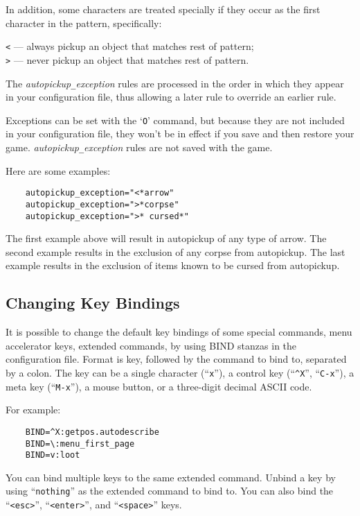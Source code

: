 In addition, some characters are treated specially if they occur as the first
character in the pattern, specifically:

{\tt <} --- always pickup an object that matches rest of pattern;\\
{\tt >} --- never pickup an object that matches rest of pattern.

The {\it autopickup\verb+_+exception\/} rules are processed in the order
in which they appear in your configuration file, thus allowing a
later rule to override an earlier rule.

Exceptions can be set with the `{\tt O}' command, but because they are not
included in your configuration file, they won't be in effect if you save
and then restore your game.
{\it autopickup\verb+_+exception\/} rules are not saved with the game.
\elist

Here are some examples:
\begin{verbatim}
    autopickup_exception="<*arrow"
    autopickup_exception=">*corpse"
    autopickup_exception=">* cursed*"
\end{verbatim}

The first example above will result in autopickup of any type of arrow.
The second example results in the exclusion of any corpse from autopickup.
The last example results in the exclusion of items known to be cursed from
autopickup.


\subsection*{Changing Key Bindings}

It is possible to change the default key bindings of some special commands,
menu accelerator keys, extended commands, by using BIND stanzas in the
configuration file. Format is key, followed by the command to bind to,
separated by a colon. The key can be a single character (``{\tt x}''),
a control key (``{\tt \^{}X}'', ``{\tt C-x}''), a meta key (``{\tt M-x}''),
a mouse button, or a three-digit decimal ASCII code.

For example:

\begin{verbatim}
    BIND=^X:getpos.autodescribe
    BIND=\:menu_first_page
    BIND=v:loot
\end{verbatim}

\blist{}
\item[\tb{Extended command keys}]
You can bind multiple keys to the same extended command. Unbind a key by
using ``{\tt nothing}'' as the extended command to bind to. You can also bind
the ``{\tt <esc>}'', ``{\tt <enter>}'', and ``{\tt <space>}'' keys.

